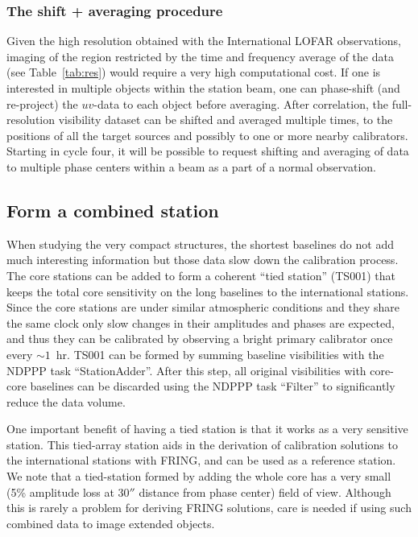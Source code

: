 \documentclass[graybox]{svmult}
\begin{document}
\subsubsection{The shift + averaging procedure}\label{sec:shift}
Given the high resolution obtained with the
International LOFAR observations, imaging of the region restricted by the time
and frequency average of the data (see Table~\ref{tab:res}) would require a
very high computational cost. If one is interested in multiple objects within
the station beam, one can phase-shift (and re-project) the $uv$-data to each
object before averaging.  After correlation, the full-resolution visibility
dataset can be shifted and averaged multiple times, to the positions of all the
target sources and possibly to one or more nearby calibrators. Starting in
cycle four, it will be possible to request shifting and averaging of data to
multiple phase centers within a beam as a part of a normal observation.

\subsection{Form a combined station}
\label{sect:ts001}
When studying the very compact structures, the shortest baselines do not add
much interesting information but those data slow down the calibration process.
The core stations can be added to form a coherent ``tied station'' (TS001) that
keeps the total core sensitivity on the long baselines to the international
stations.  Since the core stations are under similar atmospheric conditions and
they share the same clock only slow changes in their amplitudes and phases are
expected, and thus they can be calibrated by observing a bright primary
calibrator once every $\sim1$~hr. TS001 can be formed by summing baseline
visibilities with the NDPPP task ``StationAdder''.  After this step, all
original visibilities with core-core baselines can be discarded using the NDPPP
task ``Filter'' to significantly reduce the data volume.

One important benefit of having a tied station is that it works as a very
sensitive station. This tied-array station aids in the derivation of
calibration solutions to the international stations with FRING, and can be used
as a reference station. We note that a tied-station formed by adding the whole
core has a very small (5\% amplitude loss at 30$''$ distance from phase center)
field of view. Although this is rarely a problem for deriving FRING solutions,
care is needed if using such combined data to image extended objects.
\end{document}
